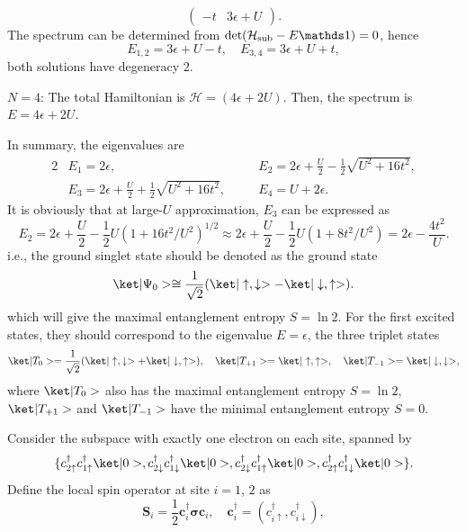 \begin{solution}
\begin{enumext}
\begin{enumext}
\[\begin{pmatrix}
          -t & 3\epsilon + U
        \end{pmatrix}.
      \]
      The spectrum can be determined
      from $\det(\mathcal H_\text{sub} - E\identity) = 0$, hence
      \[
        E_{1,2} = 3\epsilon + U - t, \quad
        E_{3,4} = 3\epsilon + U + t,
      \]
      both solutions have degeneracy $2$.
      \item $N = 4$: The total Hamiltonian is $\mathcal H = (4\epsilon + 2U)$.
      Then, the spectrum is $E = 4\epsilon + 2U$.
    \end{enumext}
    \item In summary, the eigenvalues are
    \begin{alignat*}{2}
      & E_1 = 2\epsilon, & \quad
      & E_2 = 2\epsilon + \frac U2 - \frac12\sqrt{U^2 + 16t^2},\\
      & E_3 = 2\epsilon + \frac U2 + \frac12\sqrt{U^2 + 16t^2}, &
      & E_4 = U + 2\epsilon.
    \end{alignat*}
    It is obviously that at large-$U$ approximation, $E_3$ can be expressed as
    \[
      E_2 = 2\epsilon + \frac U2 - \frac12U(1 + 16t^2/U^2)^{1/2}
      \approx 2\epsilon + \frac U2 - \frac12U(1 + 8t^2/U^2)
      = 2\epsilon - \frac{4t^2}U.
    \]
    i.e., the ground singlet state should be denoted as the ground state
    \[
      \ket|\Psi_0> \cong \frac1{\sqrt2}
      (\ket|\uparrow, \downarrow> - \ket|\downarrow, \uparrow>).
    \]
    which will give the maximal entanglement entropy $S = \ln2$.
    For the first excited states, they should correspond to the
    eigenvalue $E = \epsilon$, the three triplet states
    \[
      \ket|T_0> = \frac1{\sqrt2}
      (\ket|\uparrow, \downarrow> + \ket|\downarrow, \uparrow>),\quad
      \ket|T_{+1}> = \ket|\uparrow, \uparrow>, \quad
      \ket|T_{-1}> = \ket|\downarrow, \downarrow>,
    \]
    where $\ket|T_0>$ also has the maximal entanglement
    entropy $S = \ln 2$, $\ket|T_{+1}>$ and $\ket|T_{-1}>$ have the minimal
    entanglement entropy $S = 0$.
    \item Consider the subspace with exactly one electron on each site,
    spanned by
    \[
    \{c_{2\uparrow}^\dagger c_{1\uparrow}^\dagger\ket|0>,
      c_{2\downarrow}^\dagger c_{1\downarrow}^\dagger\ket|0>,
      c_{2\downarrow}^\dagger c_{1\uparrow}^\dagger\ket|0>,
      c_{2\uparrow}^\dagger c_{1\downarrow}^\dagger\ket|0>\}.
    \]
    Define the local spin operator at site $i = 1$, $2$ as
    \[
      \mathbf S_i = \frac12 \bm c_i^\dagger \bm{\sigma} \bm c_i, \quad
      \bm c_i^\dagger = (c_{i\uparrow}^\dagger, c_{i\downarrow}^\dagger),
\]
\end{enumext}
\end{solution}
